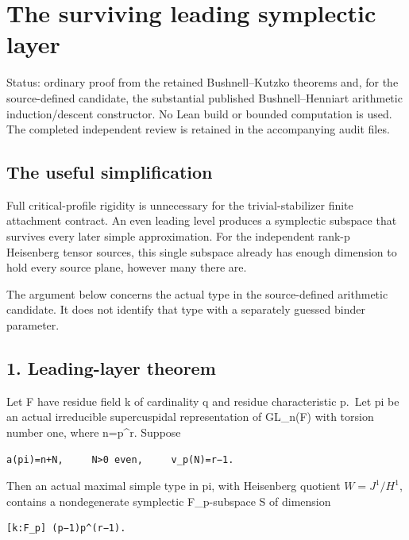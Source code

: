 \clearpage
\section{The surviving leading symplectic layer}\label{app:odd_capacity}

Status: ordinary proof from the retained Bushnell--Kutzko theorems and,
for the source-defined candidate, the substantial published
Bushnell--Henniart arithmetic induction/descent constructor. No Lean
build or bounded computation is used. The completed independent review
is retained in the accompanying audit files.

\hypertarget{odd_capacity-the-useful-simplification}{%
\subsection{The useful simplification}\label{odd_capacity-the-useful-simplification}}

Full critical-profile rigidity is unnecessary for the trivial-stabilizer
finite attachment contract. An even leading level produces a symplectic
subspace that survives every later simple approximation. For the
independent rank-p Heisenberg tensor sources, this single subspace
already has enough dimension to hold every source plane, however many
there are.

The argument below concerns the actual type in the source-defined
arithmetic candidate. It does not identify that type with a separately
guessed binder parameter.

\hypertarget{odd_capacity-leading-layer-theorem}{%
\subsection{1. Leading-layer theorem}\label{odd_capacity-leading-layer-theorem}}

Let F have residue field k of cardinality q and residue characteristic
p.~Let pi be an actual irreducible supercuspidal representation of
GL\_n(F) with torsion number one, where n=p\^{}r. Suppose

\begin{Verbatim}[fontsize=\small,breaklines=true,breakanywhere=true]
a(pi)=n+N,     N>0 even,     v_p(N)=r−1.
\end{Verbatim}

Then an actual maximal simple type in pi, with Heisenberg quotient
\(W=J^1/H^1\), contains a nondegenerate symplectic
F\_p-subspace S of dimension

\begin{Verbatim}[fontsize=\small,breaklines=true,breakanywhere=true]
[k:F_p] (p−1)p^(r−1).
\end{Verbatim}

